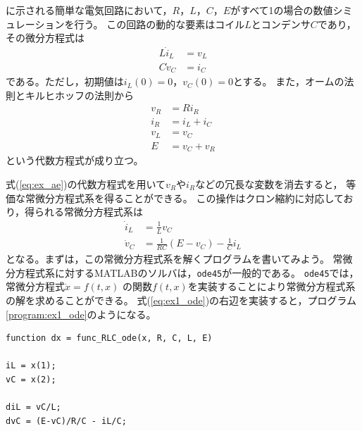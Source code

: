 \documentclass[tombow,dvipdfmx]{corona-a5-1.1}
\begin{document}
\begin{例}[簡単な微分代数方程式系の数値解法]\label{ex:dae_ex1}
に示される簡単な電気回路において，$R$，$L$，$C$，$E$がすべて1の場合の数値シミュレーションを行う。
この回路の動的な要素はコイル$L$とコンデンサ$C$であり，その微分方程式は
\begin{subequations}\label{eq:ex_de}
  \begin{align}
    L\dot i_L & = v_L \\
    C\dot v_C & = i_C
  \end{align}
\end{subequations}
である。ただし，初期値は$i_L(0)=0$，$v_C(0)=0$とする。
また，オームの法則とキルヒホッフの法則から
\begin{subequations}\label{eq:ex_ae}
  \begin{align}
    v_R & =R i_R      \\
    i_R & = i_L + i_C \\
    v_L & = v_C       \\
    E   & = v_C + v_R
  \end{align}
\end{subequations}
という代数方程式が成り立つ。

式(\ref{eq:ex_ae})の代数方程式を用いて$v_R$や$i_R$などの冗長な変数を消去すると，
等価な常微分方程式系を得ることができる。
この操作はクロン縮約に対応しており，得られる常微分方程式系は
\begin{subequations}\label{eq:ex1_ode}
  \begin{align}
    \dot{i}_L & = \frac{1}{L}v_C                     \\
    \dot{v}_C & = \frac{1}{RC}(E-v_C)-\frac{1}{C}i_L
  \end{align}
\end{subequations}
となる。まずは，この常微分方程式系を解くプログラムを書いてみよう。
常微分方程式系に対するMATLABのソルバは，\verb|ode45|が一般的である。
\verb|ode45|では，常微分方程式$\dot{x} = f(t, x)$
の関数$f(t, x)$を実装することにより常微分方程式系の解を求めることができる。
式(\ref{eq:ex1_ode})の右辺を実装すると，プログラム\ref{program:ex1_ode}のようになる。

\smallskip
\begin{PROGRAMA}[count,title={func\_RLC\_ode.m}]\label{program:ex1_ode}
  \begin{verbatim}
function dx = func_RLC_ode(x, R, C, L, E)

iL = x(1);
vC = x(2);

diL = vC/L;
dvC = (E-vC)/R/C - iL/C;


\end{verbatim}
\end{PROGRAMA}
\end{例}
\end{document}
